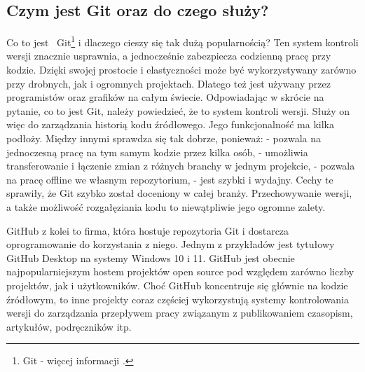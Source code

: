 \subsection{Czym jest Git oraz do czego służy?}
\hspace{0.60cm}Co to jest ~Git\footnote{Git - więcej informacji \cite{www3}.} i dlaczego cieszy się tak dużą popularnością? Ten system kontroli wersji znacznie usprawnia, a jednocześnie zabezpiecza codzienną pracę przy kodzie. Dzięki swojej prostocie i elastyczności może być wykorzystywany zarówno przy drobnych, jak i ogromnych projektach. Dlatego też jest używany przez programistów oraz grafików na całym świecie. Odpowiadając w skrócie na pytanie, co to jest Git, należy powiedzieć, że to system kontroli wersji. Służy on więc do zarządzania historią kodu źródłowego. Jego funkcjonalność ma kilka podłoży. Między innymi sprawdza się tak dobrze, ponieważ: \newline
- pozwala na jednoczesną pracę na tym samym kodzie przez kilka osób, \newline
- umożliwia transferowanie i łączenie zmian z różnych branchy w jednym projekcie, \newline
- pozwala na pracę offline we własnym repozytorium, \newline
- jest szybki i wydajny.\newline 
Cechy te sprawiły, że Git szybko został doceniony w całej branży. Przechowywanie wersji, a także możliwość rozgałęziania kodu to niewątpliwie jego ogromne zalety. 
\newline

GitHub z kolei to firma, która hostuje repozytoria Git i dostarcza oprogramowanie do korzystania z niego. Jednym z przykładów jest tytułowy GitHub Desktop na systemy Windows 10 i 11. GitHub jest obecnie najpopularniejszym hostem projektów open source pod względem zarówno liczby projektów, jak i użytkowników. Choć GitHub koncentruje się głównie na kodzie źródłowym, to inne projekty coraz częściej wykorzystują systemy kontrolowania wersji do zarządzania przepływem pracy związanym z publikowaniem czasopism, artykułów, podręczników itp.



